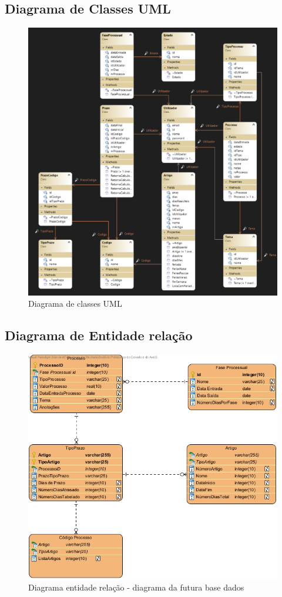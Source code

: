 \subsection{Diagrama de Classes UML}
\begin{figure}[!h]
\centering
\includegraphics[width=17cm]{Figuras/Class Diagram.png}
\caption{Diagrama de classes UML}
\label{d.componentes}
\end{figure}
\newpage

\subsection{Diagrama de Entidade relação}
\begin{figure}[!h]
\centering
\includegraphics[width=17cm]{Figuras/diagrama entidade relação.jpg}
\caption{Diagrama entidade relação - diagrama da futura base dados}
\label{d.componentes}
\end{figure}






